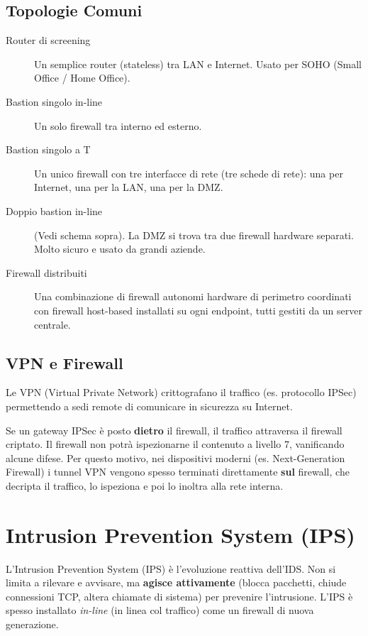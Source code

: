 \subsection{Topologie Comuni}
\begin{description}
    \item[Router di screening] Un semplice router (stateless) tra LAN e Internet. Usato per SOHO (Small Office / Home Office).
    \item[Bastion singolo in-line] Un solo firewall tra interno ed esterno.
    \item[Bastion singolo a T] Un unico firewall con tre interfacce di rete (tre schede di rete): una per Internet, una per la LAN, una per la DMZ.
    \item[Doppio bastion in-line] (Vedi schema sopra). La DMZ si trova tra due firewall hardware separati. Molto sicuro e usato da grandi aziende.
    \item[Firewall distribuiti] Una combinazione di firewall autonomi hardware di perimetro coordinati con firewall host-based installati su ogni endpoint, tutti gestiti da un server centrale.
\end{description}

\subsection{VPN e Firewall}
Le VPN (Virtual Private Network) crittografano il traffico (es. protocollo IPSec) permettendo a sedi remote di comunicare in sicurezza su Internet.
\begin{notebox}
Se un gateway IPSec è posto \textbf{dietro} il firewall, il traffico attraversa il firewall criptato. Il firewall non potrà ispezionarne il contenuto a livello 7, vanificando alcune difese. Per questo motivo, nei dispositivi moderni (es. Next-Generation Firewall) i tunnel VPN vengono spesso terminati direttamente \textbf{sul} firewall, che decripta il traffico, lo ispeziona e poi lo inoltra alla rete interna.
\end{notebox}

\section{Intrusion Prevention System (IPS)}

L'Intrusion Prevention System (IPS) è l'evoluzione reattiva dell'IDS. Non si limita a rilevare e avvisare, ma \textbf{agisce attivamente} (blocca pacchetti, chiude connessioni TCP, altera chiamate di sistema) per prevenire l'intrusione. L'IPS è spesso installato \textit{in-line} (in linea col traffico) come un firewall di nuova generazione.

